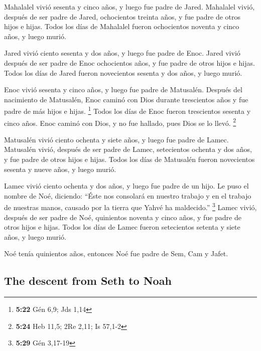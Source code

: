 \begin{paracol}{2}
 Mahalalel vivió sesenta y cinco años, y luego fue padre
de Jared.  Mahalalel vivió, después de ser padre de
Jared, ochocientos treinta años, y fue padre de otros hijos e hijas.
 Todos los días de Mahalalel fueron ochocientos noventa y
cinco años, y luego murió.

 Jared vivió ciento sesenta y dos años, y luego fue padre
de Enoc.  Jared vivió después de ser padre de Enoc
ochocientos años, y fue padre de otros hijos e hijas. 
Todos los días de Jared fueron novecientos sesenta y dos años, y luego
murió.

 Enoc vivió sesenta y cinco años, y luego fue padre de
Matusalén.  Después del nacimiento de Matusalén, Enoc
caminó con Dios durante trescientos años y fue padre de más hijos e
hijas. \footnote{\textbf{5:22} Gén 6,9; Jds 1,14}  Todos
los días de Enoc fueron trescientos sesenta y cinco años.
 Enoc caminó con Dios, y no fue hallado, pues Dios se lo
llevó. \footnote{\textbf{5:24} Heb 11,5; 2Re 2,11; Is 57,1-2}

 Matusalén vivió ciento ochenta y siete años, y luego fue
padre de Lamec.  Matusalén vivió, después de ser padre de
Lamec, setecientos ochenta y dos años, y fue padre de otros hijos e
hijas.  Todos los días de Matusalén fueron novecientos
sesenta y nueve años, y luego murió.

 Lamec vivió ciento ochenta y dos años, y luego fue padre
de un hijo.  Le puso el nombre de Noé, diciendo: ``Éste
nos consolará en nuestro trabajo y en el trabajo de nuestras manos,
causado por la tierra que Yahvé ha maldecido.'' \footnote{\textbf{5:29}
  Gén 3,17-19}  Lamec vivió, después de ser padre de Noé,
quinientos noventa y cinco años, y fue padre de otros hijos e hijas.
 Todos los días de Lamec fueron setecientos setenta y
siete años, y luego murió.

 Noé tenía quinientos años, entonces Noé fue padre de
Sem, Cam y Jafet.

\switchcolumn
\begin{otherlanguage}{english}

\hypertarget{the-descent-from-seth-to-noah}{%
\subsection{The descent from Seth to
Noah}\label{the-descent-from-seth-to-noah}}


\end{otherlanguage}
\end{paracol}
